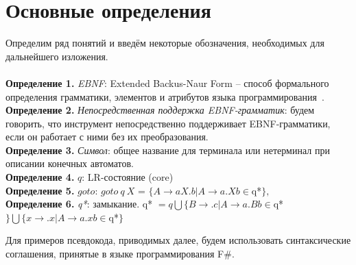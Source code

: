 \section{Основные определения}

Определим ряд понятий и введём некоторые обозначения, необходимых для дальнейшего изложения.
\\
\\
	{\bfseries Определение 1.} \textit{EBNF}: Extended Backus-Naur Form -- способ формального  определения грамматики, элементов и атрибутов языка программирования~\cite{ISOEBNF}.
\\
	{\bfseries Определение 2.} \textit{Непосредственная поддержка EBNF-грамматик}: будем говорить, что инструмент непосредственно поддерживает EBNF-грамматики, если он работает с ними без их преобразования.
\\
	{\bfseries Определение 3.} \textit{Символ}: общее название для терминала или нетерминал при описании конечных автоматов.
\\
	{\bfseries Определение 4.} \textit{$q$}: LR-состояние (core)~\cite{DrgBook}
\\
	{\bfseries Определение 5.} \textit{$goto$}: $goto \ q \ X $ = $\{A\stackrel{}{\rightarrow}aX.b | A\rightarrow a.Xb \in $q*$\}, $
\\
	{\bfseries Определение 6.} \textit{q*}: замыкание. q* $= q \bigcup \{B\rightarrow.c | A \rightarrow a.Bb \in $q*$\} \bigcup \{x\stackrel{}{\rightarrow}.x | A\stackrel{}{\rightarrow} a.xb \in $q*$\}$~\cite{DrgBook}

Для примеров псевдокода, приводимых далее, будем использовать синтаксические соглашения, принятые в языке программирования F\#.



	
	
	

